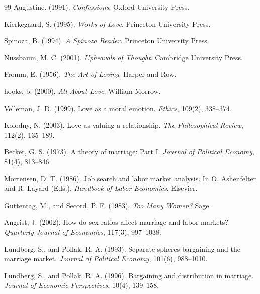 \documentclass[11pt]{article}
\begin{document}
\begin{thebibliography}{99}
Augustine. (1991).
\newblock \emph{Confessions}.
\newblock Oxford University Press.

Kierkegaard, S. (1995).
\newblock \emph{Works of Love}.
\newblock Princeton University Press.

Spinoza, B. (1994).
\newblock \emph{A Spinoza Reader}.
\newblock Princeton University Press.

Nussbaum, M. C. (2001).
\newblock \emph{Upheavals of Thought}.
\newblock Cambridge University Press.

Fromm, E. (1956).
\newblock \emph{The Art of Loving}.
\newblock Harper and Row.

hooks, b. (2000).
\newblock \emph{All About Love}.
\newblock William Morrow.

Velleman, J. D. (1999).
\newblock Love as a moral emotion.
\newblock \emph{Ethics}, 109(2), 338--374.

Kolodny, N. (2003).
\newblock Love as valuing a relationship.
\newblock \emph{The Philosophical Review}, 112(2), 135--189.

Becker, G. S. (1973).
\newblock A theory of marriage: Part I.
\newblock \emph{Journal of Political Economy}, 81(4), 813--846.

Mortensen, D. T. (1986).
\newblock Job search and labor market analysis.
\newblock In O. Ashenfelter and R. Layard (Eds.), \emph{Handbook of Labor Economics}. Elsevier.

Guttentag, M., and Secord, P. F. (1983).
\newblock \emph{Too Many Women?}
\newblock Sage.

Angrist, J. (2002).
\newblock How do sex ratios affect marriage and labor markets?
\newblock \emph{Quarterly Journal of Economics}, 117(3), 997--1038.

Lundberg, S., and Pollak, R. A. (1993).
\newblock Separate spheres bargaining and the marriage market.
\newblock \emph{Journal of Political Economy}, 101(6), 988--1010.

Lundberg, S., and Pollak, R. A. (1996).
\newblock Bargaining and distribution in marriage.
\newblock \emph{Journal of Economic Perspectives}, 10(4), 139--158.


\end{thebibliography}
\end{document}
